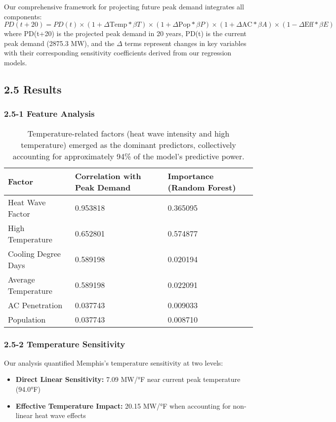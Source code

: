 \documentclass{article}
\begin{document}
Our comprehensive framework for projecting future peak demand integrates all components: 
\[PD(t+20) = PD(t) × (1 + \Delta{\text{Temp}} * \beta T) × (1 + \Delta \text{Pop} * \beta P) × (1 + \Delta \text{AC} * \beta A) × (1 - \Delta \text{Eff} * \beta E)\]
where PD(t+20) is the projected peak demand in 20 years, PD(t) is the current peak demand (2875.3 MW), and the \(Δ\) terms represent changes in key variables with their corresponding sensitivity coefficients derived from our regression models.

\subsection*{2.5 Results}
\subsubsection*{2.5-1 Feature Analysis}
\begin{table}[h]
\centering

\begin{tabular}{| l | l | l |}
\hline
Factor & Correlation with Peak Demand & Importance (Random Forest) \\
\hline
Heat Wave Factor & 0.953818 & 0.365095 \\
\hline
High Temperature & 0.652801 & 0.574877 \\
\hline
Cooling Degree Days & 0.589198 & 0.020194 \\
\hline
Average Temperature & 0.589198 & 0.022091 \\
\hline
AC Penetration & 0.037743 & 0.009033 \\
\hline
Population & 0.037743 & 0.008710 \\
\hline

\end{tabular}
\caption{Temperature-related factors (heat wave intensity and high temperature) emerged as the dominant predictors, collectively accounting for approximately 94\% of the model's predictive power.}
\label{tab:my_table}
\end{table}


\subsubsection*{2.5-2 Temperature Sensitivity}
Our analysis quantified Memphis's temperature sensitivity at two levels:
\begin{itemize}
    \item \textbf{Direct Linear Sensitivity:} 7.09 MW/°F near current peak temperature (94.0°F)
    \item \textbf{Effective Temperature Impact:} 20.15 MW/°F when accounting for non-linear heat wave effects
\end{itemize}
\end{document}
